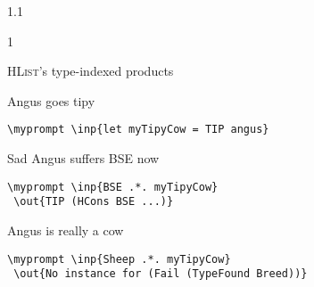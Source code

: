 \documentclass{slides}
\newenvironment{myslide}{\begin{slide}\color{Blue}\begin{boxedminipage}{1.1\hsize}\begin{boxedminipage}{1\hsize}\color{Black}
\vspace{-170\in}
}{%
\smallskip
\end{boxedminipage}
\end{boxedminipage}
\end{slide}}
\newenvironment{myslide}{\begin{slide}
}{%
\end{slide}}
\newenvironment{myslide}{\begin{slide}\color{White}\begin{boxedminipage}{1.1\hsize}\color{Black}
\vspace{-170\in}
}{%
\smallskip
\end{boxedminipage}
\end{slide}}
\newcommand{\header}[1]{{\large \color{Red} #1}}
\newcommand{\inp}[1]{{\color{Brown} \mytextbf{#1}}}
\newcommand{\out}[1]{{\color{Black} \mytextbf{#1}}}
\newcommand{\blau}[1]{{\vspace{-50\in}\normalsize \color{Blue} #1}}
\newcommand{\HList}{\textsc{HList}}
\newcommand{\myprompt}{ghci\ensuremath{>}}
\newcommand{\mytextbf}[1]{\texttt{\textbf{#1}}}
\begin{document}
\begin{myslide}

\header{\HList's type-indexed products}

\vspace{-77\in}

\blau{Angus goes tipy}

\smallskip

\begin{Verbatim}[fontfamily=courier,fontsize=\small,commandchars=\\\{\}]
 \myprompt \inp{let myTipyCow = TIP angus}
\end{Verbatim}

\vspace{-77\in}

\blau{Sad Angus suffers BSE now}

\smallskip

\begin{Verbatim}[fontfamily=courier,fontsize=\small,commandchars=\\\{\}]
 \myprompt \inp{BSE .*. myTipyCow}
 \out{TIP (HCons BSE ...)}
\end{Verbatim}

\vspace{-77\in}

\blau{Angus is really a cow}

\smallskip

\begin{Verbatim}[fontfamily=courier,fontsize=\small,commandchars=\\\{\}]
 \myprompt \inp{Sheep .*. myTipyCow}
 \out{No instance for (Fail (TypeFound Breed))}
\end{Verbatim}

\end{myslide}



\end{document}
